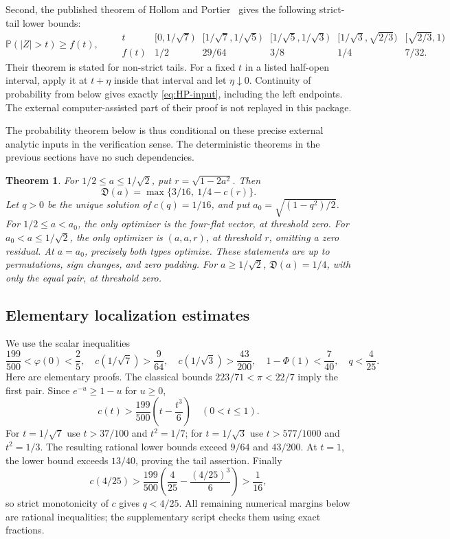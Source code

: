 \documentclass[11pt]{article}
\newtheorem{theorem}{Theorem}[section]
\theoremstyle{remark}\newtheorem{remark}[theorem]{Remark}
\newcommand{\Pp}{\mathbb P}
\begin{document}
Second, the published theorem of Hollom and Portier~\cite{HP} gives
the following strict-tail lower bounds:
\begin{equation}\label{eq:HP-input}
 \Pp(|Z|>t)\ge f(t),\qquad
\begin{array}{c|ccccc}
t &[0,1/\sqrt7)&[1/\sqrt7,1/\sqrt5)&[1/\sqrt5,1/\sqrt3)&
[1/\sqrt3,\sqrt{2/3})&[\sqrt{2/3},1)\\\hline
f(t)&1/2&29/64&3/8&1/4&7/32.
\end{array}
\end{equation}
Their theorem is stated for non-strict tails. For a fixed $t$ in a listed
half-open interval, apply it at $t+\eta$ inside that interval and let
$\eta\downarrow0$. Continuity of probability from below gives exactly
\eqref{eq:HP-input}, including the left endpoints. The external
computer-assisted part of their proof is not replayed in this package.

The probability theorem below is thus conditional on these precise
external analytic inputs in the verification sense. The deterministic
theorems in the previous sections have no such dependencies.

\begin{theorem}\label{t:main}
For $1/2\le a\le1/\sqrt2$, put $r=\sqrt{1-2a^2}$. Then
\[
 \mathfrak D(a)=\max\{3/16,\ 1/4-c(r)\}.
\]
Let $q>0$ be the unique solution of $c(q)=1/16$, and put
$a_0=\sqrt{(1-q^2)/2}$. For $1/2\le a<a_0$, the only optimizer
is the four-flat vector, at threshold zero. For $a_0<a\le1/\sqrt2$,
the only optimizer is $(a,a,r)$, at threshold $r$, omitting a zero
residual. At $a=a_0$, precisely both types optimize. These statements
are up to permutations, sign changes, and zero padding.
For $a\ge1/\sqrt2$, $\mathfrak D(a)=1/4$, with only the equal pair,
at threshold zero.
\end{theorem}


\subsection{Elementary localization estimates}
We use the scalar inequalities
\begin{equation}\label{eq:scalar-inputs}
 \frac{199}{500}<\varphi(0)<\frac25,\quad
 c(1/\sqrt7)>\frac9{64},\quad c(1/\sqrt3)>\frac{43}{200},
 \quad 1-\Phi(1)<\frac7{40},\quad q<\frac4{25}.
\end{equation}
Here are elementary proofs. The classical bounds $223/71<\pi<22/7$
imply the first pair. Since $e^{-u}\ge1-u$ for $u\ge0$,
\[
 c(t)>\frac{199}{500}\left(t-\frac{t^3}{6}\right)\quad(0<t\le1).
\]
For $t=1/\sqrt7$ use $t>37/100$ and $t^2=1/7$; for
$t=1/\sqrt3$ use $t>577/1000$ and $t^2=1/3$. The resulting rational
lower bounds exceed $9/64$ and $43/200$. At $t=1$, the lower bound
exceeds $13/40$, proving the tail assertion. Finally
\[
 c(4/25)>\frac{199}{500}
 \left(\frac4{25}-\frac{(4/25)^3}{6}\right)>\frac1{16},
\]
so strict monotonicity of $c$ gives $q<4/25$.
All remaining numerical margins below are rational inequalities; the
supplementary script  checks them using
exact fractions.
\end{document}
